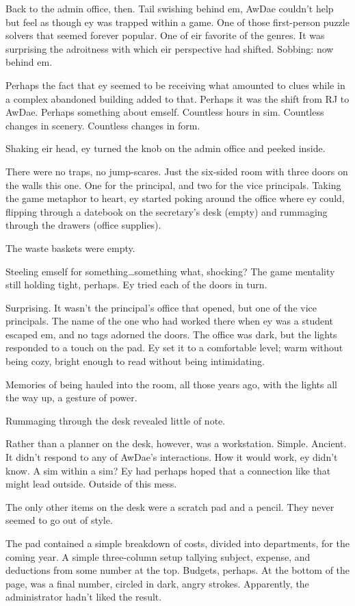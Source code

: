 Back to the admin office, then. Tail swishing behind em, AwDae couldn't help but feel as though ey was trapped within a game. One of those first-person puzzle solvers that seemed forever popular. One of eir favorite of the genres. It was surprising the adroitness with which eir perspective had shifted. Sobbing: now behind em.

Perhaps the fact that ey seemed to be receiving what amounted to clues while in a complex abandoned building added to that. Perhaps it was the shift from RJ to AwDae. Perhaps something about emself. Countless hours in sim. Countless changes in scenery. Countless changes in form.

Shaking eir head, ey turned the knob on the admin office and peeked inside.

There were no traps, no jump-scares. Just the six-sided room with three doors on the walls this one. One for the principal, and two for the vice principals. Taking the game metaphor to heart, ey started poking around the office where ey could, flipping through a datebook on the secretary's desk (empty) and rummaging through the drawers (office supplies).

The waste baskets were empty.

Steeling emself for something\ldots{}something what, shocking? The game mentality still holding tight, perhaps. Ey tried each of the doors in turn.

Surprising. It wasn't the principal's office that opened, but one of the vice principals. The name of the one who had worked there when ey was a student escaped em, and no tags adorned the doors. The office was dark, but the lights responded to a touch on the pad. Ey set it to a comfortable level; warm without being cozy, bright enough to read without being intimidating.

Memories of being hauled into the room, all those years ago, with the lights all the way up, a gesture of power.

Rummaging through the desk revealed little of note.

Rather than a planner on the desk, however, was a workstation. Simple. Ancient. It didn't respond to any of AwDae's interactions. How it would work, ey didn't know. A sim within a sim? Ey had perhaps hoped that a connection like that might lead outside. Outside of this mess.

The only other items on the desk were a scratch pad and a pencil. They never seemed to go out of style.

The pad contained a simple breakdown of costs, divided into departments, for the coming year. A simple three-column setup tallying subject, expense, and deductions from some number at the top. Budgets, perhaps. At the bottom of the page, was a final number, circled in dark, angry strokes. Apparently, the administrator hadn't liked the result.

